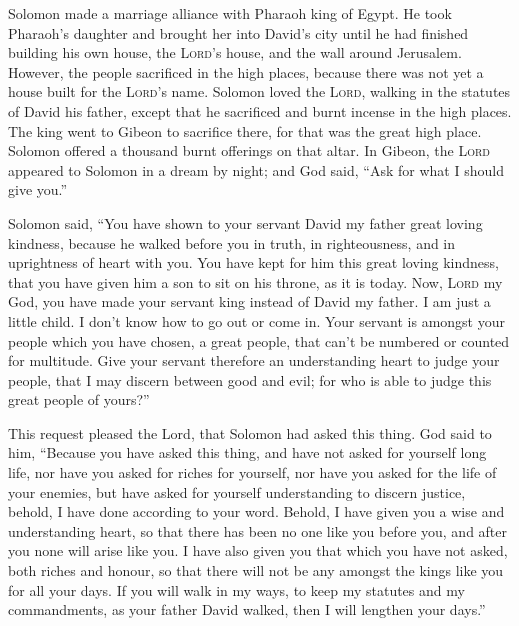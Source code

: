  Solomon made a marriage alliance with Pharaoh king of
Egypt. He took Pharaoh's daughter and brought her into David's city
until he had finished building his own house, the \textsc{Lord}'s house,
and the wall around Jerusalem.  However, the people
sacrificed in the high places, because there was not yet a house built
for the \textsc{Lord}'s name.  Solomon loved the
\textsc{Lord}, walking in the statutes of David his father, except that
he sacrificed and burnt incense in the high places.  The
king went to Gibeon to sacrifice there, for that was the great high
place. Solomon offered a thousand burnt offerings on that altar.
 In Gibeon, the \textsc{Lord} appeared to Solomon in a
dream by night; and God said, ``Ask for what I should give you.''

 Solomon said, ``You have shown to your servant David my
father great loving kindness, because he walked before you in truth, in
righteousness, and in uprightness of heart with you. You have kept for
him this great loving kindness, that you have given him a son to sit on
his throne, as it is today.  Now, \textsc{Lord} my God,
you have made your servant king instead of David my father. I am just a
little child. I don't know how to go out or come in.  Your
servant is amongst your people which you have chosen, a great people,
that can't be numbered or counted for multitude.  Give
your servant therefore an understanding heart to judge your people, that
I may discern between good and evil; for who is able to judge this great
people of yours?''

 This request pleased the Lord, that Solomon had asked
this thing.  God said to him, ``Because you have asked
this thing, and have not asked for yourself long life, nor have you
asked for riches for yourself, nor have you asked for the life of your
enemies, but have asked for yourself understanding to discern justice,
 behold, I have done according to your word. Behold, I
have given you a wise and understanding heart, so that there has been no
one like you before you, and after you none will arise like you.
 I have also given you that which you have not asked,
both riches and honour, so that there will not be any amongst the kings
like you for all your days.  If you will walk in my ways,
to keep my statutes and my commandments, as your father David walked,
then I will lengthen your days.''

